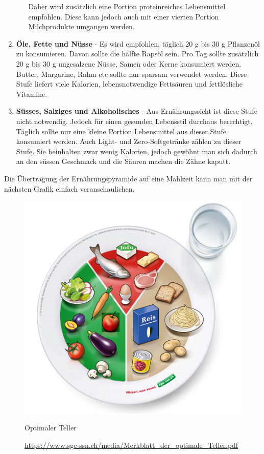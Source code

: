 \begin{enumerate}
\begin{enumerate}
    \newline
    Daher wird zusätzlich eine Portion proteinreiches Lebensmittel empfohlen. Diese kann jedoch auch mit einer vierten Portion Milchprodukte umgangen werden. \cite{stufe_fleisch_fisch_eier_tofu_2}
  \end{enumerate}
  \item \textbf{Öle, Fette und Nüsse} - Es wird empfohlen, täglich 20 g bis 30 g Pflanzenöl zu konsumieren. Davon sollte die hälfte Rapsöl sein. Pro Tag sollte zusätzlich 20 g bis 30 g ungesalzene Nüsse, Samen oder Kerne konsumiert werden.
  \newline
  Butter, Margarine, Rahm etc sollte nur sparsam verwendet werden.
  \newline
  Diese Stufe liefert viele Kalorien, lebensnotwendige Fettsäuren und fettlösliche Vitamine. \cite{stufe_le_fette_nuesse}
  \item \textbf{Süsses, Salziges und Alkoholisches} - Aus Ernährungssicht ist diese Stufe nicht notwendig. Jedoch für einen gesunden Lebensstil durchaus berechtigt. 
  Täglich sollte nur eine kleine Portion Lebensmittel aus dieser Stufe konsumiert werden.
  Auch Light- und Zero-Softgetränke zählen zu dieser Stufe. Sie beinhalten zwar wenig Kalorien, jedoch gewöhnt man sich dadurch an den süssen Geschmack und die Säuren machen die Zähne kaputt. \cite{stufe_suesses_salziges_alkoholisches}
\end{enumerate}
Die Übertragung der Ernährungspyramide auf eine Mahlzeit kann man mit der nächsten Grafik einfach veranschaulichen.
\newline
\begin{figure}[!hbpt]
  \centering
  \includegraphics[width=0.5\linewidth]{./images/der_perfekte_teller.png}
  \caption{Optimaler Teller}
  \label{fig:teller}
  \caption*{\url{https://www.sge-ssn.ch/media/Merkblatt_der_optimale_Teller.pdf}}
\end{figure}

